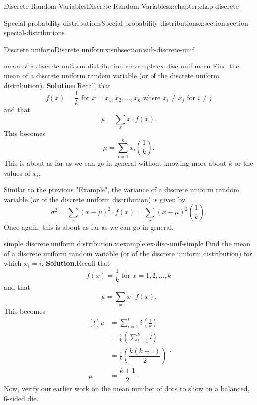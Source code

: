 \documentclass[oneside,10pt,]{book}
\newcommand{\blocktitlefont}{\relax}
\newcommand{\amp}{&}
\begin{document}
\begin{chapterptx}{Discrete Random Variables}{}{Discrete Random Variables}{}{}{x:chapter:chap-discrete}
\begin{sectionptx}{Special probability distributions}{}{Special probability distributions}{}{}{x:section:section-special-distributions}
\begin{subsectionptx}{Discrete uniform}{}{Discrete uniform}{}{}{x:subsection:sub-discrete-unif}
\begin{example}{mean of a discrete uniform distribution.}{x:example:ex-disc-unif-mean}
Find the mean of a discrete uniform random variable (or of the discrete uniform distribution).%
\textbf{\blocktitlefont Solution}.\quad{}Recall that%
\begin{equation*}
f(x) = \frac{1}{k} \text{ for } x = x_1, x_2, \dots,
x_k \text{ where }x_i\ne x_j \text{ for } i \ne j
\end{equation*}
and that%
\begin{equation*}
\mu
= \sum_x x\cdot f(x)\text{.}
\end{equation*}
This becomes%
\begin{equation*}
\mu = \sum_{i=1}^k
x_i\left(\frac{1}{k}\right)\text{.}
\end{equation*}
This is about as far as we can go in general without knowing more about \(k\) or the values of \(x_i\).%
\end{example}
Similar to the previous "Example", the variance of a discrete uniform random variable (or of the discrete uniform distribution) is given by%
\begin{equation*}
\sigma^2 = \sum_x (x-\mu)^2\cdot f(x)= \sum_x (x-\mu)^2
\left(\frac{1}{k}\right)\text{.}
\end{equation*}
Once again, this is about as far as we can go in general.%
\begin{example}{simple discrete uniform distribution.}{x:example:ex-disc-unif-simple}%
Find the mean of a discrete uniform random variable (or of the discrete uniform distribution) for which \(x_i = i\).%
\textbf{\blocktitlefont Solution}.\quad{}Recall that%
\begin{equation*}
f(x) = \frac{1}{k} \text{ for } x = 1, 2, \dots,
k
\end{equation*}
and that%
\begin{equation*}
\mu = \sum_x x\cdot f(x)\text{.}
\end{equation*}
This becomes%
\begin{equation*}
\begin{aligned}[t]
\mu \amp = \sum_{i=1}^k i\left(\frac{1}{k}\right)\\
\amp = \frac{1}{k}\left(\sum_{i=1}^k i\right)\\
\amp = \frac{1}{k}\left(\dfrac{k(k+1)}{2}\right)\\
\mu	\amp = \dfrac{k+1}{2}
\end{aligned}\text{.}
\end{equation*}
Now, verify our earlier work on the mean number of dots to show on a balanced, 6-sided die.%
\end{example}
\end{subsectionptx}

\end{sectionptx}
\end{chapterptx}
\end{document}
